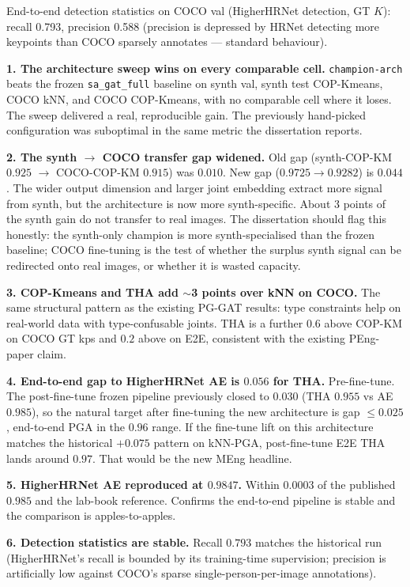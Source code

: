 \vspace{0.5em}

End-to-end detection statistics on COCO val (HigherHRNet detection, GT $K$): recall 0.793, precision 0.588 (precision is depressed by HRNet detecting more keypoints than COCO sparsely annotates --- standard behaviour).

\textbf{1. The architecture sweep wins on every comparable cell.} \texttt{champion-arch} beats the frozen \texttt{sa\_gat\_full} baseline on synth val, synth test COP-Kmeans, COCO kNN, and COCO COP-Kmeans, with no comparable cell where it loses. The sweep delivered a real, reproducible gain. The previously hand-picked configuration was suboptimal in the same metric the dissertation reports.

\textbf{2. The synth $\rightarrow$ COCO transfer gap widened.} Old gap (synth-COP-KM $0.925$ $\rightarrow$ COCO-COP-KM $0.915$) was $0.010$. New gap ($0.9725 \rightarrow 0.9282$) is $0.044$. The wider output dimension and larger joint embedding extract more signal from synth, but the architecture is now more synth-specific. About $3$ points of the synth gain do not transfer to real images. The dissertation should flag this honestly: the synth-only champion is more synth-specialised than the frozen baseline; COCO fine-tuning is the test of whether the surplus synth signal can be redirected onto real images, or whether it is wasted capacity.

\textbf{3. COP-Kmeans and THA add $\sim$3 points over kNN on COCO.} The same structural pattern as the existing PG-GAT results: type constraints help on real-world data with type-confusable joints. THA is a further $0.6$ above COP-KM on COCO GT kps and $0.2$ above on E2E, consistent with the existing PEng-paper claim.

\textbf{4. End-to-end gap to HigherHRNet AE is $0.056$ for THA.} Pre-fine-tune. The post-fine-tune frozen pipeline previously closed to $0.030$ (THA $0.955$ vs AE $0.985$), so the natural target after fine-tuning the new architecture is gap $\leq 0.025$, end-to-end PGA in the $0.96$ range. If the fine-tune lift on this architecture matches the historical $+0.075$ pattern on kNN-PGA, post-fine-tune E2E THA lands around $0.97$. That would be the new MEng headline.

\textbf{5. HigherHRNet AE reproduced at $0.9847$.} Within $0.0003$ of the published $0.985$ and the lab-book reference. Confirms the end-to-end pipeline is stable and the comparison is apples-to-apples.

\textbf{6. Detection statistics are stable.} Recall $0.793$ matches the historical run (HigherHRNet's recall is bounded by its training-time supervision; precision is artificially low against COCO's sparse single-person-per-image annotations).

